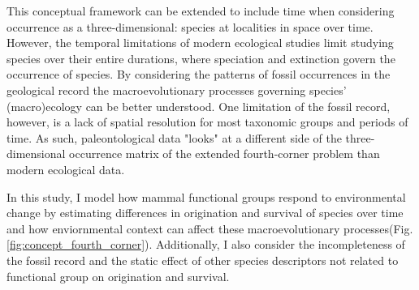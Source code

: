 \documentclass[12pt,letterpaper]{article}
\begin{document}
This conceptual framework can be extended to include time when considering occurrence as a three-dimensional: species at localities in space over time. However, the temporal limitations of modern ecological studies limit studying species over their entire durations, where speciation and extinction govern the occurrence of species. By considering the patterns of fossil occurrences in the geological record the macroevolutionary processes governing species' (macro)ecology can be better understood. One limitation of the fossil record, however, is a lack of spatial resolution for most taxonomic groups and periods of time. As such, paleontological data "looks" at a different side of the three-dimensional occurrence matrix of the extended fourth-corner problem than modern ecological data.

In this study, I model how mammal functional groups respond to environmental change by estimating differences in origination and survival of species over time and how enviornmental context can affect these macroevolutionary processes(Fig. \ref{fig:concept_fourth_corner}). Additionally, I also consider the incompleteness of the fossil record and the static effect of other species descriptors not related to functional group on origination and survival. 
\end{document}
